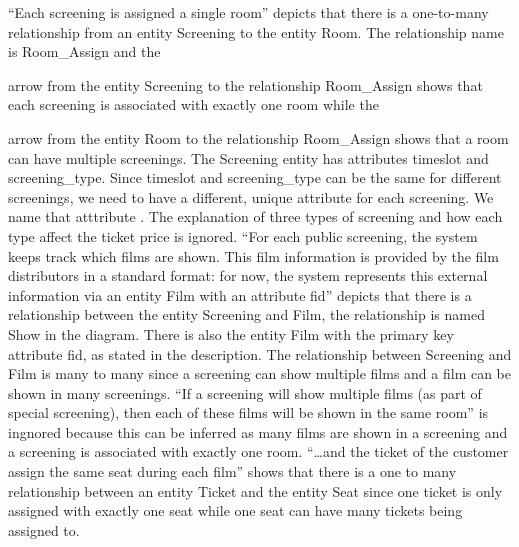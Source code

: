 \documentclass{article}
\newcommand{\key}[1]{\underline{\smash{#1}}}
\begin{document}
``Each screening is assigned a single room'' depicts that there is a one-to-many
relationship from an entity Screening to the entity Room. The relationship name
is Room\_Assign and the
arrow from the entity Screening to the relationship Room\_Assign shows that each
screening is associated with exactly one room while the
arrow from the entity Room to the relationship Room\_Assign shows that a room
can have multiple screenings. The Screening entity has attributes timeslot and
screening\_type. Since timeslot and screening\_type can be the same for different
screenings, we need to have a different, unique attribute for each screening. We
name that atttribute \key{screening\_id}. The explanation of three types of
screening and how each type affect the ticket price is ignored. ``For each public
screening, the system keeps track which films are shown. This film information is
provided by the film distributors in a standard format: for now, the system
represents this external information via an entity Film with an attribute fid''
depicts that there is a relationship between the entity Screening and Film, the
relationship is named Show in the diagram. There is also the entity Film with the
primary key attribute fid, as stated in the description. The relationship between
Screening and Film is many to many since a screening can show multiple films and
a film can be shown in many screenings. ``If a screening will show multiple films
(as part of special screening), then each of these films will be shown in the
same room'' is ingnored because this can be inferred as many films are shown in
a screening and a screening is associated with exactly one room. ``\dots and the
ticket of the customer assign the same seat during each film'' shows that there
is a one to many relationship between an entity Ticket and the entity Seat since
one ticket is only assigned with exactly one seat while one seat can have many
tickets being assigned to.
\end{document}
